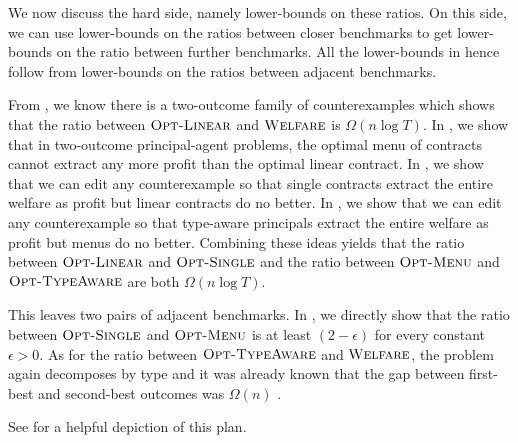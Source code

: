 \documentclass{article}
\newcommand{\OWelfare}{\textsc{Welfare}}
\newcommand{\OTypeAware}{\textsc{Opt-TypeAware}}
\newcommand{\OMenu}{\textsc{Opt-Menu}}
\newcommand{\OSingle}{\textsc{Opt-Single}}
\newcommand{\OLinear}{\textsc{Opt-Linear}}
\begin{document}
We now discuss the hard side, namely lower-bounds on these ratios. On this side, we can use lower-bounds on the ratios between closer benchmarks to get lower-bounds on the ratio between further benchmarks. All the lower-bounds in  hence follow from lower-bounds on the ratios between adjacent benchmarks.

From , we know there is a two-outcome family of counterexamples which shows that the ratio between $\OLinear$ and $\OWelfare$ is $\Omega(n \log T)$. In , we show that in two-outcome principal-agent problems, the optimal menu of contracts cannot extract any more profit than the optimal linear contract. In , we show that we can edit any counterexample so that single contracts extract the entire welfare as profit but linear contracts do no better. In , we show that we can edit any counterexample so that type-aware principals extract the entire welfare as profit but menus do no better. Combining these ideas yields that the ratio between $\OLinear$ and $\OSingle$ and the ratio between $\OMenu$ and $\OTypeAware$ are both $\Omega(n \log T)$.

This leaves two pairs of adjacent benchmarks. In , we directly show that the ratio between $\OSingle$ and $\OMenu$ is at least $(2 - \epsilon)$ for every constant $\epsilon > 0$. As for the ratio between $\OTypeAware$ and $\OWelfare$, the problem again decomposes by type and it was already known that the gap between first-best and second-best outcomes was $\Omega(n)$ \cite{dutting2019simple}.

See  for a helpful depiction of this plan.
\end{document}
